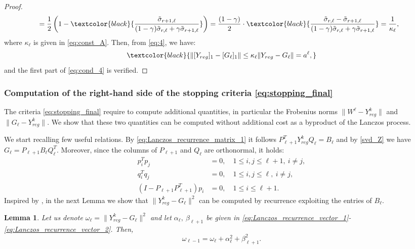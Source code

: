 \documentclass[pdflatex,sn-mathphys-num]{sn-jnl}
\numberwithin{equation}{section}%
\newcommand{\Yck}{{Y_{reg}^k}}
\newcommand{\cZ}{G}
\newcommand{\Tsvd}[1]{[ #1 ]_1}
\newcommand{\REV}[1]{\textcolor{black}{#1}}
\newcommand{\ste}[1]{\textcolor{black}{#1}}
\theoremstyle{thmstyleone}%
\newtheorem{lemma}[theorem]{Lemma}%
\theoremstyle{thmstyletwo}%
\theoremstyle{thmstylethree}%
\begin{document}
\begin{proof}
\begin{align*}
    &= \frac{1}{2} \left( 1 - \ste{\frac{\tilde\sigma_{r+1,\ell}}{(1-\gamma)\tilde\sigma_{r,\ell}+ \gamma \tilde\sigma_{r+1,\ell}}} \right)
    = \frac{(1-\gamma)}{2} \cdot\ste{\frac{\tilde \sigma_{r,\ell}-\tilde\sigma_{r+1,\ell}}{(1-\gamma)\tilde\sigma_{r,\ell}+\gamma\tilde\sigma_{r+1,\ell}}} = \frac{1}{\kappa_\ell},
\end{align*}
where $\kappa_\ell$ is given in \eqref{eq:const_A}.
Then,  from \eqref{eq:4}, we have:
\[
    \REV{\|\Tsvd{Y_{reg}} - \Tsvd{\cZ_\ell}\| \leq  \kappa_{\ell} \|Y_{reg} - \cZ_\ell\| = a^\ell,}
\]
and the first part of \eqref{eq:cond_4} is verified.
\end{proof}

\subsubsection{Computation of the right-hand side of the stopping criteria \eqref{eq:stopping_final}}

The criteria \eqref{eq:stopping_final} require to compute additional quantities, in particular the Frobenius norms $\| W^\ell - \Yck \|$ and $\| \cZ_\ell - \Yck \|$. We show that these two quantities can be computed without additional cost as a byproduct of the Lanczos process.

We start recalling few useful relations. By \eqref{eq:Lanczos_recurrence_matrix_1} it follows $P_{\ell+1}^T Y_{reg}^k Q_{\ell} = B_{\ell}$ and by \eqref{svd_Z} we have $\cZ_\ell = P_{\ell+1} B_\ell Q_\ell^T$. Moreover, since the columns of $P_{\ell + 1}$ and $Q_{\ell}$ are orthonormal, it holds:
\begin{align}
	p_{i}^T p_{j} &= 0, \quad 1 \le i,j \le \ell+1, \ i \neq j, \label{eq:orth_p} \\
	q_{i}^T q_{j} &= 0, \quad 1 \le i,j \le \ell, \ i \neq j, \label{eq:orth_q} \\
	(I - P_{\ell+1} P_{\ell+1}^T)p_{i}&=0,
    \quad 1 \le i \le \ell+1. 
    \label{eq:orth_I_PP}
\end{align}
Inspired by \cite{Simon2000}, in the next Lemma we show that $\| \Yck-\cZ_\ell \| ^2$ can be computed by recurrence exploiting the entries of $B_{\ell}$. 

\begin{lemma} \label{lem:criterion1}
	Let us denote $\omega_\ell = \| \Yck-\cZ_\ell \| ^2$ and let $\alpha_\ell, \ \beta_{\ell+1}$ be given in \eqref{eq:Lanczos_recurrence_vector_1}-\eqref{eq:Lanczos_recurrence_vector_2}. Then,
	\[
	\omega_{\ell-1} = \omega_{\ell} + \alpha_{\ell}^2 + \beta_{\ell+1}^2.
	\]
\end{lemma}
\end{document}
